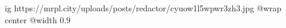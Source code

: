 
 
 
 
 

\ifcmt
  ig https://mrpl.city/uploads/posts/redactor/cyuow1l5wpwr3zh3.jpg
  @wrap center
  @width 0.9
\fi


